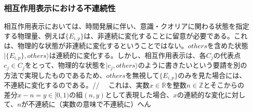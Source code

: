 \subsubsection{相互作用表示における不連続性}
相互作用表示においては、時間発展に伴い、意識・クオリアに関わる状態を指定する物理量、例えば$\{E_{i,p}\}$は、非連続に変化することに留意が必要である。これは、物理的な状態が非連続に変化するということではない。$others$を含めた状態$|\{ E_{i,p}\},others \rangle$は連続的に変化する。しかし、相互作用表示は、各$C_j$の代表点$c_j \in C_j$をとって、物理的な状態を$|c_j,others \rangle$のように書きたいという要請を別の方法で実現したものであるため、$others$を無視して$\{E_{i,p}\}$のみを見た場合には、不連続に変化するのである。//
　これは、実数$x \in \mathbb{R}$を整数$n \in \mathbb{Z}$とそこからの差分$x-n = y \in [0,1)$の組$(n,y)$として表現した場合、$x$の連続的な変化に対して、$n$が不連続に（実数の意味で不連続に）へん
